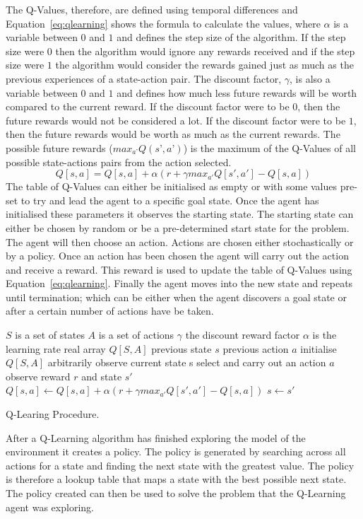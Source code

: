 The Q-Values, therefore, are defined using temporal differences and Equation~\ref{eq:qlearning} shows the formula to calculate the values, where $\alpha$ is a variable between $0$ and $1$ and defines the step size of the algorithm. If the step size were $0$ then the algorithm would ignore any rewards received and if the step size were $1$ the algorithm would consider the rewards gained just as much as the previous experiences of a state-action pair. The discount factor, $\gamma$, is also a variable between $0$ and $1$ and defines how much less future rewards will be worth compared to the current reward. If the discount factor were to be $0$, then the future rewards would not be considered a lot. If the discount factor were to be $1$, then the future rewards would be worth as much as the current rewards. The possible future rewards ($max_{a’}Q(s’,a’)$) is the maximum of the Q-Values of all possible state-actions pairs from the action selected.
\begin{equation} \label{eq:qlearning}
Q[s,a] = Q[s,a] + {\alpha}(r+ {\gamma}max_{a'} Q[s',a'] - Q[s,a])
\end{equation}
The table of Q-Values can either be initialised as empty or with some values pre-set to try and lead the agent to a specific goal state. Once the agent has initialised these parameters it observes the starting state. The starting state can either be chosen by random or be a pre-determined start state for the problem. The agent will then choose an action. Actions are chosen either stochastically or by a policy. Once an action has been chosen the agent will carry out the action and receive a reward. This reward is used to update the table of Q-Values using Equation~\ref{eq:qlearning}. Finally the agent moves into the new state and repeats until termination; which can be either when the agent discovers a goal state or after a certain number of actions have be taken.
\begin{algorithm}
\begin{algorithmic}[1]
\Require
 	\Statex $S$ is a set of states
 	\Statex $A$ is a set of actions
 	\Statex $\gamma$ the discount reward factor
 	\Statex $\alpha$ is the learning rate
	\State real array $Q[S,A]$
	\State previous state $s$
	\State previous action $a$
	\State initialise $Q[S,A]$ arbitrarily
	\State observe current state s
	\Repeat
		\State select and carry out an action $a$
		\State observe reward $r$ and state $s'$
		\State $Q[s,a] \gets Q[s,a]+\alpha(r+\gamma max_{a'}Q[s',a']-Q[s,a])$
		\State $s \gets s'$
\EndProcedure
\end{algorithmic}
\caption{Q-Learing Procedure.}\label{alg:qlearning}
\end{algorithm}

After a Q-Learning algorithm has finished exploring the model of the environment it creates a policy. The policy is generated by searching across all actions for a state and finding the next state with the greatest value. The policy is therefore a lookup table that maps a state with the best possible next state. The policy created can then be used to solve the problem that the Q-Learning agent was exploring.~\cite{poole2010artificial}